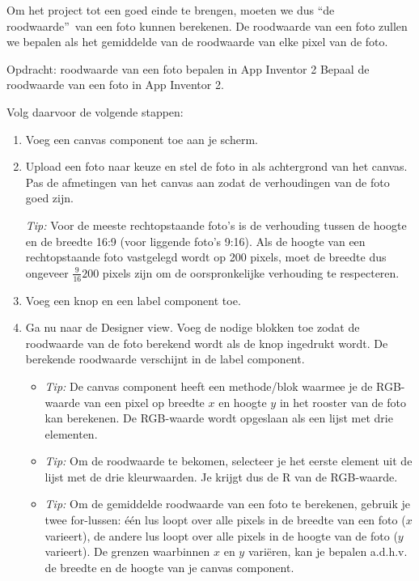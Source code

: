 
Om het project tot een goed einde te brengen, moeten we dus \textquotedblleft de roodwaarde\textquotedblright\  van een foto kunnen berekenen. 
De roodwaarde van een foto zullen we bepalen als het gemiddelde van de roodwaarde van elke pixel van de foto.


\begin{opdracht}{Opdracht: roodwaarde van een foto bepalen in App Inventor 2}
Bepaal de roodwaarde van een foto in App Inventor 2.

Volg daarvoor de volgende stappen:
\begin{enumerate}
	\item Voeg een canvas component toe aan je scherm. 
	\item Upload een foto naar keuze en stel de foto in als achtergrond van het canvas.
	Pas de afmetingen van het canvas aan zodat de verhoudingen van de foto goed zijn. 
	
	\emph{Tip:} Voor de meeste rechtopstaande foto's is de verhouding tussen de hoogte en de breedte 16:9 (voor liggende foto's 9:16). Als de hoogte van een rechtopstaande foto vastgelegd wordt op 200 pixels, moet de breedte dus ongeveer $\frac{9}{16}200$ pixels zijn om de oorspronkelijke verhouding te respecteren.
	 
	\item Voeg een knop en een label component toe.
	
	\item Ga nu naar de Designer view. Voeg de nodige blokken toe zodat de roodwaarde van de foto berekend wordt als de knop ingedrukt wordt. De berekende roodwaarde verschijnt in de label component.
	
	\begin{itemize}
		\item \emph{Tip:} De canvas component heeft een methode/blok waarmee je de RGB-waarde van een pixel op breedte $x$ en hoogte $y$ in het rooster van de foto kan berekenen. De RGB-waarde wordt opgeslaan als een lijst met drie elementen.
		
		\item \emph{Tip:} Om de roodwaarde te bekomen, selecteer je het eerste element uit de lijst met de drie kleurwaarden. Je krijgt dus de R van de RGB-waarde.
		
		\item \emph{Tip:} Om de gemiddelde roodwaarde van een foto te berekenen, gebruik je twee for-lussen: \'e\'en lus loopt over alle pixels in de breedte van een foto ($x$ varieert), de andere lus loopt over alle pixels in de hoogte van de foto ($y$ varieert). De grenzen waarbinnen $x$ en $y$ vari\"eren, kan je bepalen a.d.h.v. de breedte en de hoogte van je canvas component.
		

\end{itemize}
\end{enumerate}
\end{opdracht}
